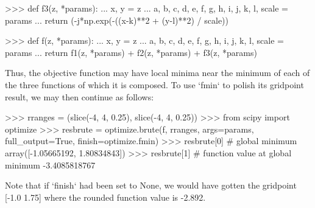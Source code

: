 \begin{DoxyVerb}
>>> def f3(z, *params):
...     x, y = z
...     a, b, c, d, e, f, g, h, i, j, k, l, scale = params
...     return (-j*np.exp(-((x-k)**2 + (y-l)**2) / scale))

>>> def f(z, *params):
...     x, y = z
...     a, b, c, d, e, f, g, h, i, j, k, l, scale = params
...     return f1(z, *params) + f2(z, *params) + f3(z, *params)

Thus, the objective function may have local minima near the minimum
of each of the three functions of which it is composed.  To
use `fmin` to polish its gridpoint result, we may then continue as
follows:

>>> rranges = (slice(-4, 4, 0.25), slice(-4, 4, 0.25))
>>> from scipy import optimize
>>> resbrute = optimize.brute(f, rranges, args=params, full_output=True,
                              finish=optimize.fmin)
>>> resbrute[0]  # global minimum
array([-1.05665192,  1.80834843])
>>> resbrute[1]  # function value at global minimum
-3.4085818767

Note that if `finish` had been set to None, we would have gotten the
gridpoint [-1.0 1.75] where the rounded function value is -2.892.\end{DoxyVerb}
 \hypertarget{namespacescipy_1_1optimize_1_1optimize_a7885f92532c0dbc6878f0f33364265c6}{}
